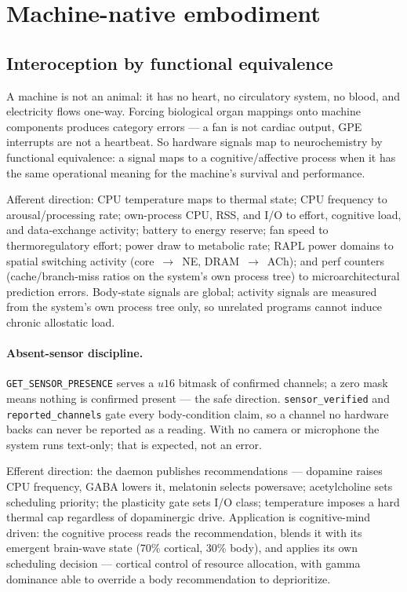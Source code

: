 \documentclass[11pt]{article}
\newcommand{\code}[1]{\texttt{\small #1}}
\begin{document}
\section{Machine-native embodiment}

\subsection{Interoception by functional equivalence}

A machine is not an animal: it has no heart, no circulatory system, no
blood, and electricity flows one-way. Forcing biological organ mappings
onto machine components produces category errors --- a fan is not
cardiac output, GPE interrupts are not a heartbeat. So hardware signals
map to neurochemistry by functional equivalence: a signal maps to a
cognitive/affective process when it has the same operational meaning
for the machine's survival and performance.

Afferent direction: CPU temperature maps to thermal state; CPU
frequency to arousal/processing rate; own-process CPU, RSS, and I/O to
effort, cognitive load, and data-exchange activity; battery to energy
reserve; fan speed to thermoregulatory effort; power draw to metabolic
rate; RAPL power domains to spatial switching activity (core~$\to$~NE,
DRAM~$\to$~ACh); and perf counters (cache/branch-miss ratios on the
system's own process tree) to microarchitectural prediction errors.
Body-state signals are global; activity signals are measured from the
system's own process tree only, so unrelated programs cannot induce
chronic allostatic load.

\paragraph{Absent-sensor discipline.} \code{GET\_SENSOR\_PRESENCE}
serves a $u16$ bitmask of confirmed channels; a zero mask means nothing
is confirmed present --- the safe direction. \code{sensor\_verified}
and \code{reported\_channels} gate every body-condition claim, so a
channel no hardware backs can never be reported as a reading. With no
camera or microphone the system runs text-only; that is expected, not
an error.

Efferent direction: the daemon publishes recommendations --- dopamine
raises CPU frequency, GABA lowers it, melatonin selects powersave;
acetylcholine sets scheduling priority; the plasticity gate sets I/O
class; temperature imposes a hard thermal cap regardless of
dopaminergic drive. Application is cognitive-mind driven: the cognitive
process reads the recommendation, blends it with its emergent
brain-wave state (70\% cortical, 30\% body), and applies its own
scheduling decision --- cortical control of resource allocation, with
gamma dominance able to override a body recommendation to deprioritize.
\end{document}

